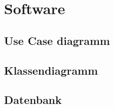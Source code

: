 \chapter{Software}

\section{Use Case diagramm}
\section{Klassendiagramm}

\section{Datenbank}

\centering{\Huge{$\vdots$}}